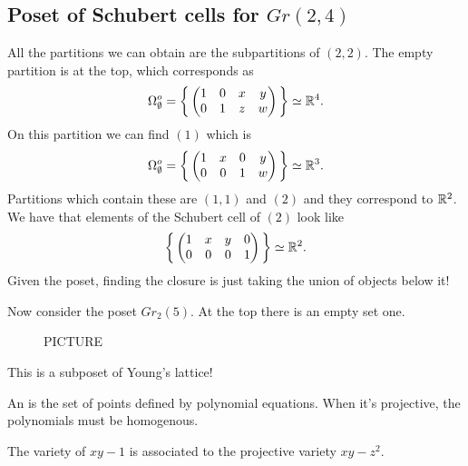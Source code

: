 \documentclass[12pt]{memoir}
\begin{document}
\subsection{Poset of Schubert cells for $Gr(2,4)$}

All the partitions we can obtain are the subpartitions of $(2,2)$. The empty partition is at the top, which corresponds as 
$$\Omega_\emptyset^o=\biggl\{\,\begin{pmatrix}1&0&x&y\\0&1&z&w\end{pmatrix}\,\biggr\}\simeq\mathbb{R}^4.$$
On this partition we can find $(1)$ which is 
$$\Omega_\emptyset^o=\biggl\{\,\begin{pmatrix}1&x&0&y\\0&0&1&w\end{pmatrix}\,\biggr\}\simeq\mathbb{R}^3.$$
Partitions which contain these are $(1,1)$ and $(2)$ and they correspond to $\mathbb{R}^2$. We have that elements of the Schubert cell of $(2)$ look like 
$$\biggl\{\,\begin{pmatrix}1&x&y&0\\0&0&0&1\end{pmatrix}\,\biggr\}\simeq\mathbb{R}^2.$$
Given the poset, finding the closure is just taking the union of objects below it!

\begin{Ex}
    Now consider the poset $Gr_2(5)$. At the top there is an empty set one.
    \begin{figure}
        PICTURE
    \end{figure}
    This is a subposet of Young's lattice!
\end{Ex}

\begin{Def}
    An  is the set of points defined by polynomial equations. When it's projective, the polynomials must be homogenous.
\end{Def}

\begin{Ex}
    The variety of $xy-1$ is associated to the projective variety $xy-z^2$.
\end{Ex}
\ifx\nextra\undefined
\printindex
\else\fi
\nocite{*}


\end{document}

